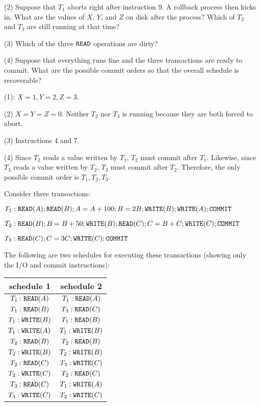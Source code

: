 (2) Suppose that $T_1$ aborts right after instruction 9. A rollback process then kicks in. What are the values of $X$, $Y$, and $Z$ on disk after the process? Which of $T_2$ and $T_3$ are still running at that time?

(3) Which of the three $\texttt{READ}$ operations are dirty?

(4) Suppose that everything runs fine and the three transactions are ready to commit. What are the possible commit orders so that the overall schedule is recoverable?

\begin{sol}
 (1): $X = 1, Y = 2, Z = 3$.

\vgap

(2) $X = Y = Z = 0$. Neither $T_2$ nor $T_3$ is running because they are both forced to abort.

\vgap

(3) Instructions 4 and 7.

\vgap

(4) Since $T_2$ reads a value written by $T_1$, $T_2$ must commit after $T_1$. Likewise, since $T_3$ reads a value written by $T_2$, $T_3$ must commit after $T_2$. Therefore, the only possible commit order is $T_1, T_2, T_3$.
\end{sol}

 Consider three transactions:

$T_1: \texttt{READ}(A); \texttt{READ}(B); A = A + 100; B = 2B; \texttt{WRITE}(B); \texttt{WRITE}(A); \texttt{COMMIT}$

$T_2: \texttt{READ}(B); B = B + 50; \texttt{WRITE}(B); \texttt{READ}(C); C = B + C; \texttt{WRITE}(C); \texttt{COMMIT}$

$T_3: \texttt{READ}(C); C = 3C; \texttt{WRITE}(C); \texttt{COMMIT}$

The following are two schedules for executing these transactions (showing only the I/O and commit instructions):

\begin{center}
    \begin{tabular}{c|c}
        schedule 1 & schedule 2 \\
        \hline
        $T_1: \texttt{READ}(A)$ & $T_1: \texttt{READ}(A)$ \\
        $T_1: \texttt{READ}(B)$ & $T_3: \texttt{READ}(C)$ \\
        $T_1: \texttt{WRITE}(B)$ & $T_1: \texttt{READ}(B)$ \\
        $T_1: \texttt{WRITE}(A)$ & $T_1: \texttt{WRITE}(B)$ \\
        $T_2: \texttt{READ}(B)$ & $T_2: \texttt{READ}(B)$ \\
        $T_2: \texttt{WRITE}(B)$ & $T_2: \texttt{WRITE}(B)$  \\
        $T_2: \texttt{READ}(C)$ & $T_3: \texttt{WRITE}(C)$  \\
        $T_2: \texttt{WRITE}(C)$ & $T_2: \texttt{READ}(C)$  \\
        $T_3: \texttt{READ}(C)$ &  $T_1: \texttt{WRITE}(A)$ \\
        $T_3: \texttt{WRITE}(C)$ & $T_2: \texttt{WRITE}(C)$
    \end{tabular}
\end{center}

